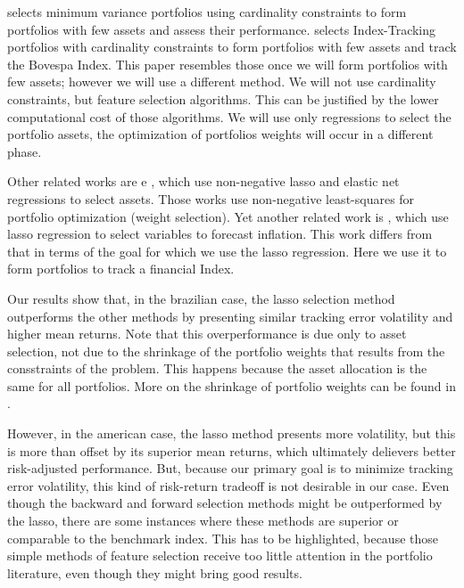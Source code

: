 \documentclass[preprint, doubleblind, authoryear,10pt]{elsarticle}
\begin{document}
\cite{santos15} selects minimum variance portfolios using cardinality constraints to form portfolios with few assets and assess their performance.
\cite{rbfin-it} selects Index-Tracking portfolios with cardinality constraints to form portfolios with few assets and track the Bovespa Index.
This paper resembles those once we will form portfolios with few assets; however we will use a different method.
We will not use cardinality constraints, but feature selection algorithms.
This can be justified by the lower computational cost of those algorithms.
We will use only regressions to select the portfolio assets, the optimization of portfolios weights will occur in a different phase.

Other related works are \cite{nnl14} e \cite{nnen14}, which use non-negative lasso and elastic net regressions to select assets.
Those works use non-negative least-squares for portfolio optimization (weight selection).
Yet another related work is \cite{lasso-infl}, which use lasso regression to select variables to forecast inflation.
This work differs from that in terms of the goal for which we use the lasso regression.
Here we use it to form portfolios to track a financial Index.


Our results show that, in the brazilian case, the lasso selection method outperforms the other methods by presenting similar tracking error volatility and higher mean returns.
Note that this overperformance is due only to asset selection, not due to the shrinkage of the portfolio weights that results from the consstraints of the problem.
This happens because the asset allocation is the same for all portfolios.
More on the shrinkage of portfolio weights can be found in \cite{fan-2012, jag-2003, brodie2009}.

However, in the american case, the lasso method presents more volatility, but this is more than offset by its superior mean returns, which ultimately delievers better risk-adjusted performance.
But, because our primary goal is to minimize tracking error volatility, this kind of risk-return tradeoff is not desirable in our case.
Even though the backward and forward selection methods might be outperformed by the lasso, there are some instances where these methods are superior or comparable to the benchmark index. 
This has to be highlighted, because those simple methods of feature selection receive too little attention in the portfolio literature, even though they might bring good results.
\end{document}
